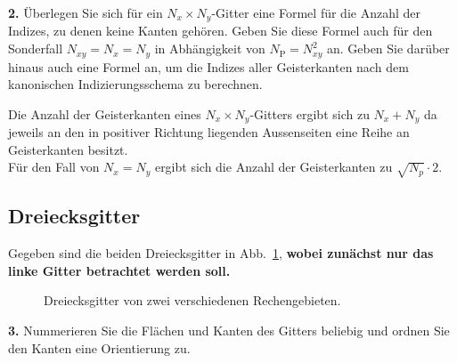 \documentclass[Protokollheft.tex]{subfiles}
\begin{document}
        \begin{framed}
	\noindent \textbf{2.} \label{vorb:formel} Überlegen Sie sich für ein $N_x\times N_y$-Gitter eine Formel für die
        Anzahl der Indizes, zu denen keine Kanten gehören. Geben Sie diese Formel auch für den Sonderfall
        $N_{xy}=N_x=N_y$ in Abhängigkeit von $N_{\text{P}}=N_{xy}^2$ an. Geben Sie darüber hinaus auch eine Formel an, um die Indizes aller Geisterkanten nach dem kanonischen Indizierungsschema zu berechnen.\label{exer:nrOfGhostEdges}
\end{framed}

Die Anzahl der Geisterkanten eines $N_x \times N_y$-Gitters ergibt sich zu $N_x + N_y$ da jeweils an den in positiver Richtung liegenden Aussenseiten eine Reihe an Geisterkanten besitzt.\\
Für den Fall von $N_x = N_y$ ergibt sich die Anzahl der Geisterkanten zu $\sqrt{N_p} \cdot 2$. 

%
    {\subsection{Dreiecksgitter}}
    Gegeben sind die beiden Dreiecksgitter in Abb.~\ref{fig:tetmesh}, \textbf{wobei
    zunächst nur das linke Gitter betrachtet werden soll.}
  \begin{figure}[htb]
    \centering
    \begin{subfigure}{0.49\textwidth}
        \centering
                    
    \end{subfigure}
    \begin{subfigure}{0.49\textwidth}
        \centering
        
    \end{subfigure}
    \caption{Dreiecksgitter von zwei verschiedenen Rechengebieten.}
    \label{fig:tetmesh}
  \end{figure}

        \begin{framed}
	\noindent \textbf{3.} Nummerieren Sie die Flächen und Kanten des Gitters beliebig und ordnen
                    Sie den Kanten eine Orientierung zu.\label{exer:triangleOrderedNumbering}
\end{framed}
\end{document}
